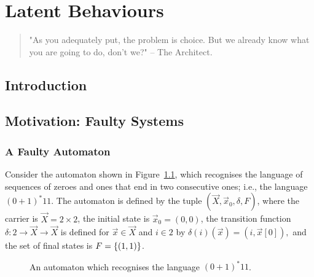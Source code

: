 

\chapter{Latent Behaviours} %
\label{ch:LatentBehaviours} %
\begin{quote} 
"As you adequately put, the problem is choice. But we already know what you are going to do, don't we?" -- The Architect.
\end{quote} 

\section{Introduction}

\section{Motivation: Faulty Systems}

\subsection{A Faulty Automaton}
Consider the automaton shown in Figure~\ref{fig:ExampleLatent}, which recognises the language of sequences of zeroes and ones that end in two consecutive ones; i.e., the language $(0+1)^*11$. The automaton is defined by the tuple $(\vec{X},\vec{x}_0,\delta,F)$, where the carrier is $\vec{X}=2\times2$, the initial state is $\vec{x}_0=(0,0)$, the transition function $\delta\colon 2\rightarrow\vec{X}\rightarrow \vec{X}$ is defined for $\vec{x}\in \vec{X}$ and $i \in 2$ by $\delta(i)(\vec{x})=(i,\vec{x}[0]),$ and the set of final states is $F=\left\{(1,1)\right\}$.

\begin{figure}[t]
    \centering
    \caption{An automaton which recognises the language $(0+1)^*11$.}
    \label{fig:ExampleLatent}
\end{figure}

